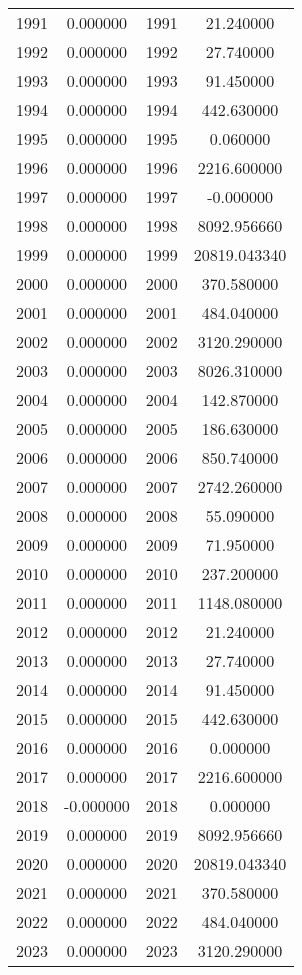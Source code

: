 \documentclass[12pt]{article}
\begin{document}
\begin{longtable}{@{}cccc@{}}
1991 & 0.000000 & 1991 & 21.240000 \\
1992 & 0.000000 & 1992 & 27.740000 \\
1993 & 0.000000 & 1993 & 91.450000 \\
1994 & 0.000000 & 1994 & 442.630000 \\
1995 & 0.000000 & 1995 & 0.060000 \\
1996 & 0.000000 & 1996 & 2216.600000 \\
1997 & 0.000000 & 1997 & -0.000000 \\
1998 & 0.000000 & 1998 & 8092.956660 \\
1999 & 0.000000 & 1999 & 20819.043340 \\
2000 & 0.000000 & 2000 & 370.580000 \\
2001 & 0.000000 & 2001 & 484.040000 \\
2002 & 0.000000 & 2002 & 3120.290000 \\
2003 & 0.000000 & 2003 & 8026.310000 \\
2004 & 0.000000 & 2004 & 142.870000 \\
2005 & 0.000000 & 2005 & 186.630000 \\
2006 & 0.000000 & 2006 & 850.740000 \\
2007 & 0.000000 & 2007 & 2742.260000 \\
2008 & 0.000000 & 2008 & 55.090000 \\
2009 & 0.000000 & 2009 & 71.950000 \\
2010 & 0.000000 & 2010 & 237.200000 \\
2011 & 0.000000 & 2011 & 1148.080000 \\
2012 & 0.000000 & 2012 & 21.240000 \\
2013 & 0.000000 & 2013 & 27.740000 \\
2014 & 0.000000 & 2014 & 91.450000 \\
2015 & 0.000000 & 2015 & 442.630000 \\
2016 & 0.000000 & 2016 & 0.000000 \\
2017 & 0.000000 & 2017 & 2216.600000 \\
2018 & -0.000000 & 2018 & 0.000000 \\
2019 & 0.000000 & 2019 & 8092.956660 \\
2020 & 0.000000 & 2020 & 20819.043340 \\
2021 & 0.000000 & 2021 & 370.580000 \\
2022 & 0.000000 & 2022 & 484.040000 \\
2023 & 0.000000 & 2023 & 3120.290000 \\

\end{longtable}
\end{document}
